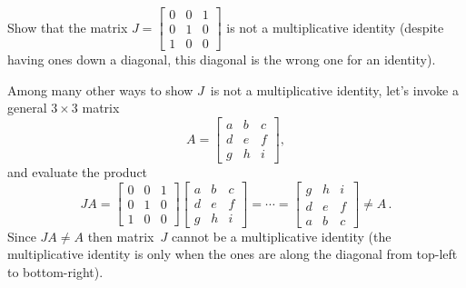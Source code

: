 \begin{example} \label{eg:}
Show that the matrix \(J=\begin{bmatrix} 0&0&1\\0&1&0\\1&0&0 \end{bmatrix}\) is not a multiplicative identity (despite having ones down a diagonal, this diagonal is the wrong one for an identity).
\begin{solution} 
Among many other ways to show \(J\)~is not a multiplicative identity, let's invoke a general \(3\times3\) matrix
\begin{equation*}
A=\begin{bmatrix} a&b&c\\d&e&f\\g&h&i \end{bmatrix},
\end{equation*}
and evaluate the product
\begin{equation*}
JA=
\begin{bmatrix} 0&0&1\\0&1&0\\1&0&0 \end{bmatrix}
\begin{bmatrix} a&b&c\\d&e&f\\g&h&i \end{bmatrix}
=\cdots
=\begin{bmatrix} g&h&i\\d&e&f\\a&b&c \end{bmatrix}
\neq A\,.
\end{equation*}
Since \(JA\neq A\) then matrix~\(J\) cannot be a multiplicative identity (the multiplicative identity is only when the ones are along the diagonal from top-left to bottom-right).
\end{solution}
\end{example}




